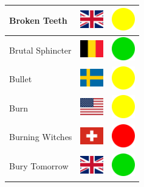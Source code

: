 \documentclass[12pt, a4paper, twoside]{report}
\begin{document}
\begin{center}
\begin{longtable}{|p{5cm}|p{2cm}|p{2cm}|}
 Broken Teeth                                               & \includegraphics[width=1cm]{../img/flags/gb} &   \includegraphics[width=1cm]{../likes/m} \\ \hline
 Brutal Sphincter                                           & \includegraphics[width=1cm]{../img/flags/be} &   \includegraphics[width=1cm]{../likes/y} \\ \hline
 Bullet                                                     & \includegraphics[width=1cm]{../img/flags/se} &   \includegraphics[width=1cm]{../likes/m} \\ \hline
 Burn                                                       & \includegraphics[width=1cm]{../img/flags/us} &   \includegraphics[width=1cm]{../likes/m} \\ \hline
 Burning Witches                                            & \includegraphics[width=1cm]{../img/flags/ch} &   \includegraphics[width=1cm]{../likes/n} \\ \hline
 Bury Tomorrow                                              & \includegraphics[width=1cm]{../img/flags/gb} &   \includegraphics[width=1cm]{../likes/y} \\ \hline

\end{longtable}
\end{center}
\end{document}
